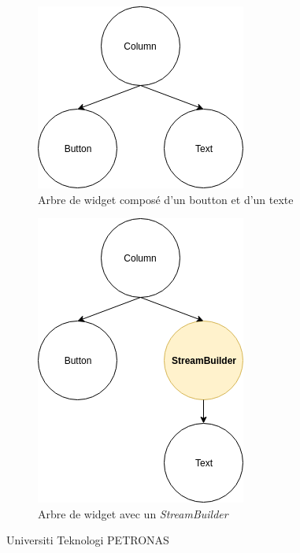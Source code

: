 \begin{figure}[H]
  \centering
  \begin{subfigure}{.5\textwidth}
    \centering
    \includegraphics[width=.8\linewidth]{content/imgs/ex1.png}
    \caption{Arbre de widget composé d'un boutton et d'un texte}
    \label{fig:stream_ex1}
  \end{subfigure}%
  \begin{subfigure}{.5\textwidth}
    \centering
    \includegraphics[width=.8\linewidth]{content/imgs/ex2.png}
    \caption{Arbre de widget avec un \textit{StreamBuilder}}
  \end{subfigure}
  \caption{Universiti Teknologi PETRONAS}
\end{figure}

